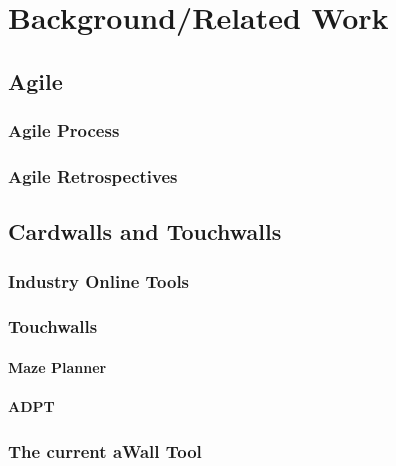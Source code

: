 \chapter{Background/Related Work}\label{C:background}

\section{Agile}

\subsection{Agile Process}

\subsection{Agile Retrospectives}


\section{Cardwalls and Touchwalls}
\subsection{Industry Online Tools}

\subsection{Touchwalls}
\subsubsection{Maze Planner}
\subsubsection{ADPT}
\subsection{The current aWall Tool}